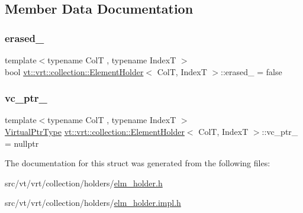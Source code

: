 \subsection{Member Data Documentation}
\mbox{\label{structvt_1_1vrt_1_1collection_1_1_element_holder_ae832cd8e53efb97b0b57497320d3fa2f}} 
\subsubsection{\texorpdfstring{erased\+\_\+}{erased\_}}
{\footnotesize\ttfamily template$<$typename ColT , typename IndexT $>$ \\
bool \hyperlink{structvt_1_1vrt_1_1collection_1_1_element_holder}{vt\+::vrt\+::collection\+::\+Element\+Holder}$<$ ColT, IndexT $>$\+::erased\+\_\+ = false}

\mbox{\label{structvt_1_1vrt_1_1collection_1_1_element_holder_a2112b3755d594225583fb89ab3185bd2}} 
\subsubsection{\texorpdfstring{vc\+\_\+ptr\+\_\+}{vc\_ptr\_}}
{\footnotesize\ttfamily template$<$typename ColT , typename IndexT $>$ \\
\hyperlink{structvt_1_1vrt_1_1collection_1_1_element_holder_afc12d1a71ec8f735f1b7fe12a067c8a6}{Virtual\+Ptr\+Type} \hyperlink{structvt_1_1vrt_1_1collection_1_1_element_holder}{vt\+::vrt\+::collection\+::\+Element\+Holder}$<$ ColT, IndexT $>$\+::vc\+\_\+ptr\+\_\+ = nullptr}



The documentation for this struct was generated from the following files\+:\begin{DoxyCompactItemize}
\item 
src/vt/vrt/collection/holders/\hyperlink{elm__holder_8h}{elm\+\_\+holder.\+h}\item 
src/vt/vrt/collection/holders/\hyperlink{elm__holder_8impl_8h}{elm\+\_\+holder.\+impl.\+h}\end{DoxyCompactItemize}

